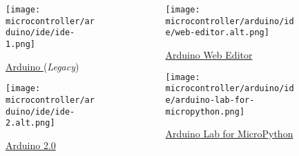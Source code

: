 \begin{frame}
    \begin{columns}
        \begin{column}{0.45\textwidth}
            \begin{figure}
                \texttt{[image: microcontroller/arduino/ide/ide-1.png]}
                \caption{\href{https://www.arduino.cc/en/Guide}{Arduino\textregistered{} } (\textit{Legacy})}
            \end{figure}
            \begin{figure}
                \texttt{[image: microcontroller/arduino/ide/ide-2.alt.png]}
                \caption{\href{https://docs.arduino.cc/software/ide-v2/tutorials/getting-started-ide-v2}{Arduino\textregistered{}  2.0}}
            \end{figure}
        \end{column}
        \begin{column}{0.55\textwidth}
            \begin{figure}
                \texttt{[image: microcontroller/arduino/ide/web-editor.alt.png]}
                \caption{\href{https://docs.arduino.cc/arduino-cloud/getting-started/getting-started-web-editor}{Arduino\textregistered{} Web Editor}}
            \end{figure}
            \begin{figure}
                \texttt{[image: microcontroller/arduino/ide/arduino-lab-for-micropython.png]}
                \caption{\href{https://docs.arduino.cc/micropython/}{Arduino\textregistered{} Lab for MicroPython}}
            \end{figure}
        \end{column}
    \end{columns}
\end{frame}
